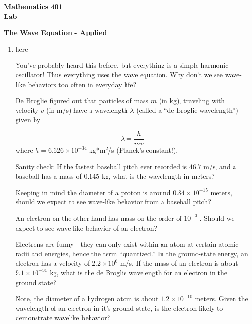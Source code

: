 \documentclass[11pt]{article}
\begin{document}
\noindent
{\bf Mathematics 401} \\
{\bf Lab} \\

\begin{center}
{\Large {\bf The Wave Equation - Applied}}
\end{center}

\begin{enumerate}
\item here


\noindent You've probably heard this before, but everything is a simple harmonic oscillator!  Thus everything uses the wave equation.  Why don't we see wave-like behaviors too often in everyday life?

De Broglie figured out that particles of mass $m$ (in kg), traveling with velocity $v$ (in m/s) have a wavelength $\lambda$ (called a ``de Broglie wavelength'') given by 

$$\lambda = \frac{h}{mv}$$
where $h = 6.626 \times 10^{-34}$ kg*m$^2$/s (Planck's constant!).

Sanity check:  If the fastest baseball pitch ever recorded is $46.7$ m/s, and a baseball has a mass of $0.145$ kg, what is the wavelength in meters?  
\vspace{2cm}

Keeping in mind the diameter of a proton is around $0.84 \times 10^{-15}$ meters, should we expect to see wave-like behavior from a baseball pitch?
\vspace{2cm}


An electron on the other hand has mass on the order of $10^{-31}$.  Should we expect to see wave-like behavior of an electron?  

\vspace{2cm}

Electrons are funny - they can only exist within an atom at certain atomic radii and energies, hence the term ``quantized.''  In the ground-state energy, an electron has a velocity of $2.2 \times 10^{6}$ m/s.  If the mass of an electron is about $9.1 \times 10^{-31}$ kg, what is the de Broglie wavelength for an electron in the ground state?

\vspace{3cm}

Note, the diameter of a hydrogen atom is about $1.2 \times 10^{-10}$ meters.  Given the wavelength of an electron in it's ground-state, is the electron likely to demonstrate wavelike behavior?

\vspace{1cm}
\newpage


\end{enumerate}
\end{document}
